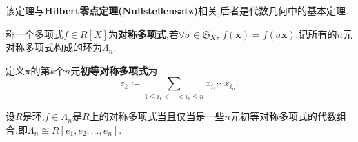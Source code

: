 该定理与\textbf{Hilbert零点定理(Nullstellensatz)}相关,后者是代数几何中的基本定理.
\begin{definition}
	称一个多项式$f\in R[X]$为\textbf{对称多项式},若$\forall \sigma\in \mathfrak{S}_X$, $f(\bm{x})=f(\sigma\bm{x})$.记所有的$n$元对称多项式构成的环为$\Lambda_n$.
\end{definition}
\begin{definition}\label{def:ele-sym}
	定义$\bm{x}$的第$k$个$n$元\textbf{初等对称多项式}为
	\[e_k\coloneqq\sum_{1 \leq i_1 < \cdots < i_k \leq n} x_{i_1} \cdots x_{i_n}.\]
\end{definition}
\begin{theorem}[对称多项式基本定理]\label{thm:sym-basic}
	设$R$是环,$f\in \Lambda_n$是$R$上的对称多项式当且仅当是一些$n$元初等对称多项式的代数组合.即$\Lambda_n\cong R[e_1,e_2,\dots,e_n]$.
\end{theorem}